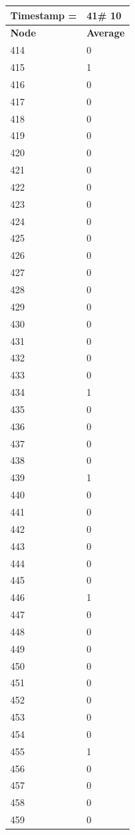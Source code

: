 \begin{tabular}{|l||l|}
\hline
\textbf{Timestamp =} & \textbf{41}\# 10\\\hline
	\textbf{Node} & \textbf{Average} \\ \hline
\hline
	414 & 0 \\ \hline
	415 & 1 \\ \hline
	416 & 0 \\ \hline
	417 & 0 \\ \hline
	418 & 0 \\ \hline
	419 & 0 \\ \hline
	420 & 0 \\ \hline
	421 & 0 \\ \hline
	422 & 0 \\ \hline
	423 & 0 \\ \hline
	424 & 0 \\ \hline
	425 & 0 \\ \hline
	426 & 0 \\ \hline
	427 & 0 \\ \hline
	428 & 0 \\ \hline
	429 & 0 \\ \hline
	430 & 0 \\ \hline
	431 & 0 \\ \hline
	432 & 0 \\ \hline
	433 & 0 \\ \hline
	434 & 1 \\ \hline
	435 & 0 \\ \hline
	436 & 0 \\ \hline
	437 & 0 \\ \hline
	438 & 0 \\ \hline
	439 & 1 \\ \hline
	440 & 0 \\ \hline
	441 & 0 \\ \hline
	442 & 0 \\ \hline
	443 & 0 \\ \hline
	444 & 0 \\ \hline
	445 & 0 \\ \hline
	446 & 1 \\ \hline
	447 & 0 \\ \hline
	448 & 0 \\ \hline
	449 & 0 \\ \hline
	450 & 0 \\ \hline
	451 & 0 \\ \hline
	452 & 0 \\ \hline
	453 & 0 \\ \hline
	454 & 0 \\ \hline
	455 & 1 \\ \hline
	456 & 0 \\ \hline
	457 & 0 \\ \hline
	458 & 0 \\ \hline
	459 & 0 \\ \hline
\end{tabular}
